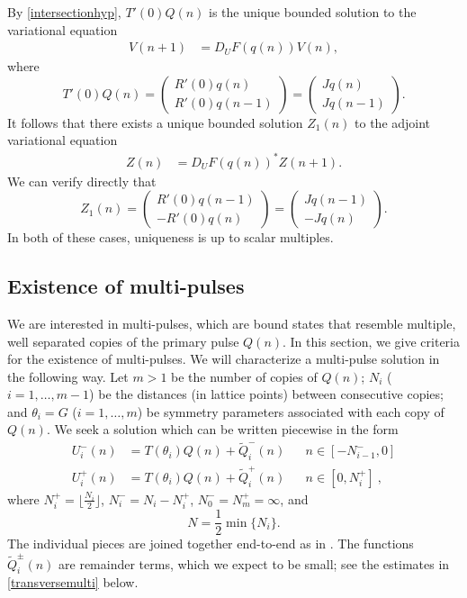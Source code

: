 \documentclass[12pt]{elsarticle}
\begin{document}
By \cref{intersectionhyp}, $T'(0) Q(n)$ is the unique bounded solution to the variational equation
\begin{align*}
V(n+1) &= D_U F(q(n)) V(n),
\end{align*}
where
\begin{equation}\label{varsol}
T'(0) Q(n) = \begin{pmatrix} R'(0) q(n) \\ R'(0) q(n-1) \end{pmatrix} = \begin{pmatrix} J q(n) \\ J q(n-1) \end{pmatrix}.
\end{equation}
It follows that there exists a unique bounded solution $Z_1(n)$ to the adjoint variational equation
\begin{align*}
Z(n) &= D_U F(q(n))^* Z(n+1).
\end{align*}
We can verify directly that
\begin{equation}\label{adjvarsol}
Z_1(n) = \begin{pmatrix} R'(0) q(n-1) \\ -R'(0) q(n) \end{pmatrix} = \begin{pmatrix} J q(n-1) \\ -J q(n) \end{pmatrix}.
\end{equation}
In both of these cases, uniqueness is up to scalar multiples.

\subsection{Existence of multi-pulses}

We are interested in multi-pulses, which are bound states that resemble multiple, well separated copies of the primary pulse $Q(n)$. In this section, we give criteria for the existence of multi-pulses. We will characterize a multi-pulse solution in the following way. Let $m > 1$ be the number of copies of $Q(n)$; $N_i$ ($i = 1, \dots, m-1$) be the distances (in lattice points) between consecutive copies; and $\theta_i = G$ ($i = 1, \dots, m$) be symmetry parameters associated with each copy of $Q(n)$. We seek a solution which can be written piecewise in the form 
\begin{equation}\label{Upiecewise}
\begin{aligned}
U_i^-(n) &= T(\theta_i) Q(n) + \tilde{Q}_i^-(n) && n \in [-N_{i-1}^-, 0] \\
U_i^+(n) &= T(\theta_i) Q(n) + \tilde{Q}_i^+(n) && n \in [0, N_i^+] \:,
\end{aligned}
\end{equation}
where $N_i^+ = \lfloor \frac{N_i}{2} \rfloor$, $N_i^- = N_i - N_i^+$, $N_0^- = N_m^+ = \infty$, and
\begin{equation}\label{defN}
N = \frac{1}{2} \min\{ N_i \}.
\end{equation}
The individual pieces are joined together end-to-end as in \cite{Sandstede1998}. The functions $\tilde{Q}_i^\pm(n)$ are remainder terms, which we expect to be small; see the estimates in \cref{transversemulti} below.
\end{document}
